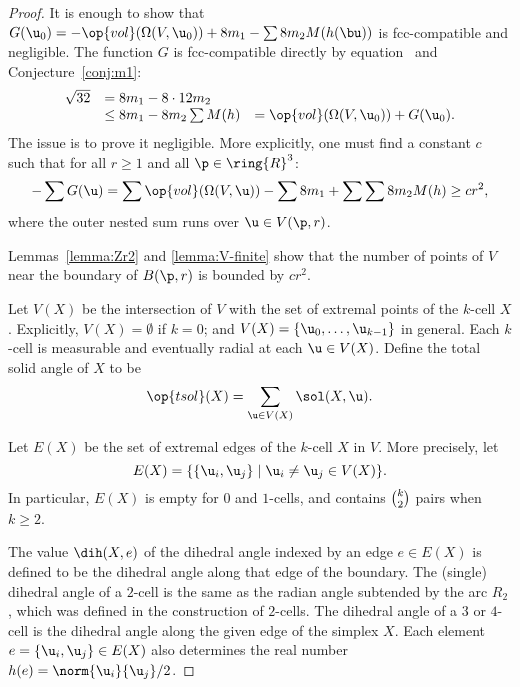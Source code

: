 \begin{proof} 
It is enough to show that $G( \u_0) = -\op{vol}(\Omega(V, \u_0)) + 8
m_1 - \sum 8 m_2 M(h(\bu))$ is fcc-compatible and negligible.
The function $G$ is fcc-compatible directly
by equation~
and Conjecture~\ref{conj:m1}:
%
%
\begin{displaymath}
\begin{array}{lll}
\sqrt{32} &= 8 m_1 - 8\cdot 12 m_2\\
&\le 8 m_1 - 8 m_2 \sum M(h)
&= \op{vol}(\Omega(V, \u_0)) + G( \u_0).
\end{array}
\end{displaymath}  
The issue is to prove it negligible.  More explicitly, one must find a
constant $c$ such that for all $r\ge 1$ and all $\p\in\ring{R}^3$:
\begin{equation}\label{eqn:neg}
-\sum G( \u) = \sum \op{vol}(\Omega(V, \u)) -\sum 8m_1 + \sum \sum 8 m_2 M(h) \ge c r^2,
\end{equation}
where the outer nested sum runs over $ \u\in  V(\p,r)$.

Lemmas~\ref{lemma:Zr2} and \ref{lemma:V-finite} show that the number
of points of $ V$ near the boundary of $B(\p,r)$ is bounded by $c
r^2$.

Let $V(X)$ be the intersection of $ V$ with the set of extremal points
of the $k$-cell $X$.  Explicitly, $V(X)=\emptyset$ if $k=0$; and $V(X)
= \{ \u_0,\ldots, \u_{k-1}\}$ in general.  Each $k$-cell is measurable
and eventually radial at each $ \u\in V(X)$.  Define the total solid
angle of $X$ to be
\begin{displaymath}
\op{tsol}(X) = \sum_{ \u\in V(X)} \sol(X, \u).
\end{displaymath}
%
%
%

Let $E(X)$ be the set of extremal edges of the $k$-cell $X$ in $ V$.
More precisely, let
\begin{displaymath}E(X)=\{\{ \u_i, \u_j\}\mid \u_i\ne \u_j\in
V(X)\}.\end{displaymath}
In particular, $E(X)$ is empty for $0$ and $1$-cells, and contains
$\tbinom{k}{2}$ pairs when $k\ge 2$.
%

The value $\dih(X,e)$ of the dihedral angle indexed by an edge $e\in
E(X)$ is defined to be the dihedral angle along that edge of the
boundary.  The (single) dihedral angle of a $2$-cell is the same as
the radian angle subtended by the arc $R_2$, which was defined in the
construction of $2$-cells.  The dihedral angle of a $3$ or $4$-cell is
the dihedral angle along the given edge of the simplex $X$.
  Each
element $e=\{ \u_i, \u_j\}\in E(X)$ also determines the real number
$h(e) = \norm{ \u_i}{ \u_j}/2$.


\end{proof}
